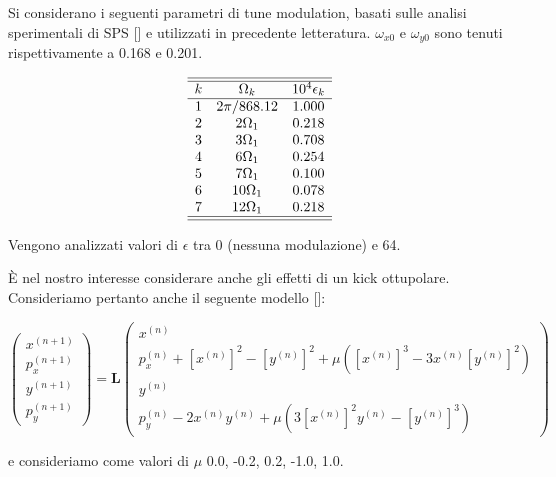 \documentclass[10pt,a4paper]{article}
\begin{document}
Si considerano i seguenti parametri di tune modulation, basati sulle analisi sperimentali di SPS [] e utilizzati in precedente letteratura. $\omega_{x0}$ e $\omega_{y0}$ sono tenuti rispettivamente a 0.168 e 0.201.

\begin{equation}
    \begin{array}{ccc}
    \hline \hline k & \Omega_{k} & 10^{4} \epsilon_{k} \\
    \hline 1 & 2 \pi / 868.12 & 1.000 \\
    2 & 2 \Omega_{1} & 0.218 \\
    3 & 3 \Omega_{1} & 0.708 \\
    4 & 6 \Omega_{1} & 0.254 \\
    5 & 7 \Omega_{1} & 0.100 \\
    6 & 10 \Omega_{1} & 0.078 \\
    7 & 12 \Omega_{1} & 0.218 \\
    \hline \hline
    \end{array}
\end{equation}

Vengono analizzati valori di $\epsilon$ tra 0 (nessuna modulazione) e 64.

È nel nostro interesse considerare anche gli effetti di un kick ottupolare. Consideriamo pertanto anche il seguente modello []:

\begin{equation}
    \left(\begin{array}{c}
    x^{(n+1)} \\
    p_{x}^{(n+1)} \\
    y^{(n+1)} \\
    p_{y}^{(n+1)}
    \end{array}\right)=\mathbf{L}\left(\begin{array}{c}
    x^{(n)} \\
    p_{x}^{(n)}+\left[x^{(n)}\right]^{2}-\left[y^{(n)}\right]^{2} + \mu(\left[x^{(n)}\right]^{3} - 3 x^{(n)}\left[y^{(n)}\right]^{2}) \\
    y^{(n)} \\
    p_{y}^{(n)}-2 x^{(n)} y^{(n)} + \mu(3\left[x^{(n)}\right]^{2}y^{(n)} -\left[y^{(n)}\right]^{3})
    \end{array}\right)
\end{equation}

e consideriamo come valori di $\mu$ 0.0, -0.2, 0.2, -1.0, 1.0.
\end{document}

